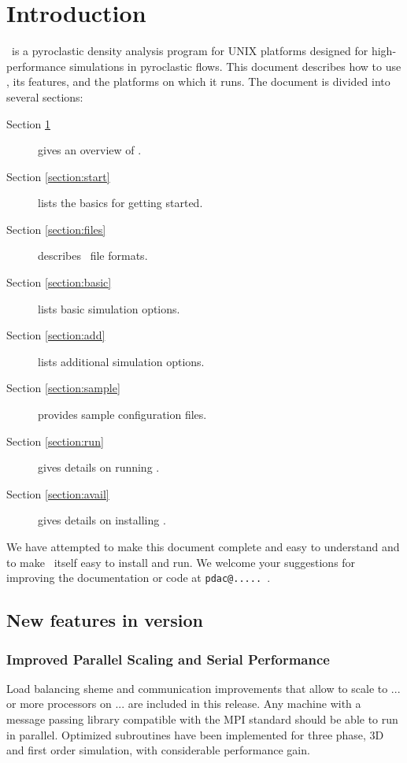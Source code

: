 

\section{Introduction}
\label{section:intro}

\PDAC\ is a pyroclastic density analysis program for UNIX 
platforms designed for high-performance 
simulations in pyroclastic flows.  This document describes how to use 
\PDAC, its features, and the platforms on which it runs.
The document is divided into several sections:
\begin{description}
\item[Section \ref{section:intro}] gives an overview of \PDAC.
\item[Section \ref{section:start}] lists the basics for getting started.
\item[Section \ref{section:files}] describes \PDAC\ file formats.
\item[Section \ref{section:basic}] lists basic simulation options.
\item[Section \ref{section:add}] lists additional simulation options.
\item[Section \ref{section:sample}] provides sample configuration files.
\item[Section \ref{section:run}] gives details on running \PDAC.
\item[Section \ref{section:avail}] gives details on installing \PDAC.
\end{description}

We have attempted to make this document 
complete and easy to understand and to make \PDAC\ itself
easy to install and run.
We welcome your suggestions for improving the documentation or code
at {\tt pdac@..... }.

\subsection{New features in version \PDACVERSION}

\subsubsection*{Improved Parallel Scaling and Serial Performance}

Load balancing sheme and communication improvements that allow
\PDAC to scale to ... or more processors on ... are
included in this release. Any machine with a message passing
library compatible with the MPI standard should be able to run
\PDAC in parallel.
Optimized subroutines have been implemented for three phase, 3D and
first order simulation, with considerable performance gain.


